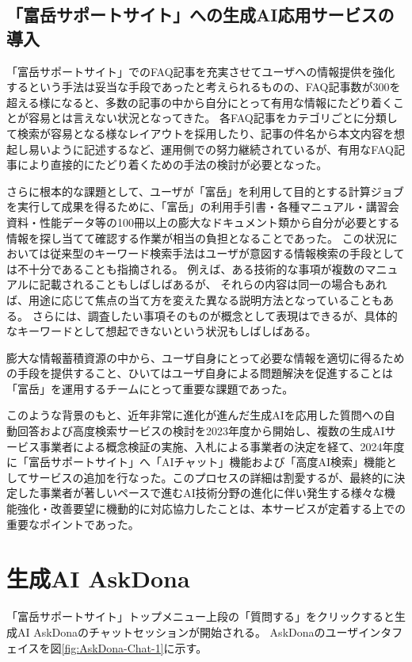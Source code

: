 \documentclass{jsaxiesproc}
\begin{document}
\subsection{「富岳サポートサイト」への生成AI応用サービスの導入}

「富岳サポートサイト」でのFAQ記事を充実させてユーザへの情報提供を強化するという手法は妥当な手段であったと考えられるものの、FAQ記事数が300を超える様になると、多数の記事の中から自分にとって有用な情報にたどり着くことが容易とは言えない状況となってきた。
各FAQ記事をカテゴリごとに分類して検索が容易となる様なレイアウトを採用したり、記事の件名から本文内容を想起し易いように記述するなど、運用側での努力継続されているが、有用なFAQ記事により直接的にたどり着くための手法の検討が必要となった。

さらに根本的な課題として、ユーザが「富岳」を利用して目的とする計算ジョブを実行して成果を得るために、「富岳」の利用手引書・各種マニュアル・講習会資料・性能データ等の100冊以上の膨大なドキュメント類から自分が必要とする情報を探し当てて確認する作業が相当の負担となることであった。
この状況においては従来型のキーワード検索手法はユーザが意図する情報検索の手段としては不十分であることも指摘される。
例えば、ある技術的な事項が複数のマニュアルに記載されることもしばしばあるが、
それらの内容は同一の場合もあれば、用途に応じて焦点の当て方を変えた異なる説明方法となっていることもある。
さらには、調査したい事項そのものが概念として表現はできるが、具体的なキーワードとして想起できないという状況もしばしばある。

膨大な情報蓄積資源の中から、ユーザ自身にとって必要な情報を適切に得るための手段を提供すること、ひいてはユーザ自身による問題解決を促進することは「富岳」を運用するチームにとって重要な課題であった。

このような背景のもと、近年非常に進化が進んだ生成AIを応用した質問への自動回答および高度検索サービスの検討を2023年度から開始し、複数の生成AIサービス事業者による概念検証の実施、入札による事業者の決定を経て、2024年度に「富岳サポートサイト」へ「AIチャット」機能および「高度AI検索」機能としてサービスの追加を行なった。このプロセスの詳細は割愛するが、最終的に決定した事業者が著しいペースで進むAI技術分野の進化に伴い発生する様々な機能強化・改善要望に機動的に対応協力したことは、本サービスが定着する上での重要なポイントであった。



\section{生成AI AskDona}

「富岳サポートサイト」トップメニュー上段の「質問する」をクリックすると生成AI AskDonaのチャットセッションが開始される。
AskDonaのユーザインタフェイスを図\ref{fig:AskDona-Chat-1}に示す。
\end{document}
